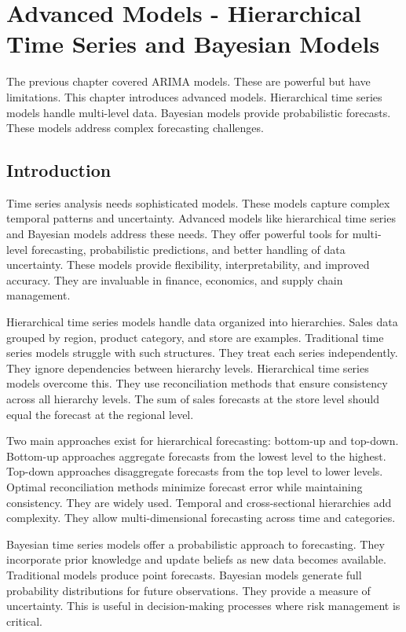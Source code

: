 \chapter{Advanced Models - Hierarchical Time Series and Bayesian Models}

The previous chapter covered ARIMA models. These are powerful but have limitations. This chapter introduces advanced models. Hierarchical time series models handle multi-level data. Bayesian models provide probabilistic forecasts. These models address complex forecasting challenges.

\section{Introduction}

Time series analysis needs sophisticated models. These models capture complex temporal patterns and uncertainty. Advanced models like hierarchical time series and Bayesian models address these needs. They offer powerful tools for multi-level forecasting, probabilistic predictions, and better handling of data uncertainty. These models provide flexibility, interpretability, and improved accuracy. They are invaluable in finance, economics, and supply chain management.

Hierarchical time series models handle data organized into hierarchies. Sales data grouped by region, product category, and store are examples. Traditional time series models struggle with such structures. They treat each series independently. They ignore dependencies between hierarchy levels. Hierarchical time series models overcome this. They use reconciliation methods that ensure consistency across all hierarchy levels. The sum of sales forecasts at the store level should equal the forecast at the regional level.

Two main approaches exist for hierarchical forecasting: bottom-up and top-down. Bottom-up approaches aggregate forecasts from the lowest level to the highest. Top-down approaches disaggregate forecasts from the top level to lower levels. Optimal reconciliation methods minimize forecast error while maintaining consistency. They are widely used. Temporal and cross-sectional hierarchies add complexity. They allow multi-dimensional forecasting across time and categories.

Bayesian time series models offer a probabilistic approach to forecasting. They incorporate prior knowledge and update beliefs as new data becomes available. Traditional models produce point forecasts. Bayesian models generate full probability distributions for future observations. They provide a measure of uncertainty. This is useful in decision-making processes where risk management is critical.

